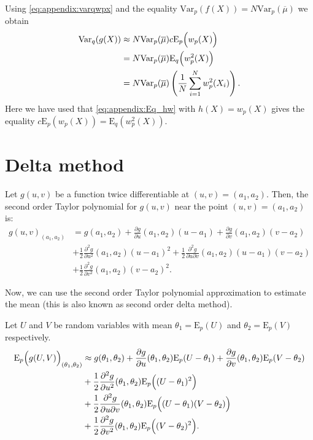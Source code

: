 \documentclass{amsart}
\newcommand{\Var}{\mathrm{Var}}
\theoremstyle{plain}%
\begin{document}
Using \cref{eq:appendix:varqwpx} and the equality $\Var_p(f(X))=N \Var_p(\overline{\mu})$ we obtain
\begin{align}
\Var_q(g(X)) & \approx N \Var_p(\overline{\mu}) c \mathrm{E}_p\Bigl( w_p(X) \Bigr)
\\ & =
N \Var_p(\overline{\mu}) \mathrm{E}_q\Bigl( w^2_p(X) \Bigr)
\\ & =
N \Var_p(\overline{\mu}) \left(\frac{1}{N}\sum_{i=1}^N w_p^2(X_i)\right).
\end{align}
Here we have used that \cref{eq:appendix:Eq_hw} with $h(X)=w_p(X)$ gives the equality $c \mathrm{E}_p( w_p(X) ) = \mathrm{E}_q( w_p^2(X) )$.

\section{Delta method} 

Let $g(u,v)$ be a function twice differentiable at $(u,v) = (a_1,a_2)$. Then, the second order Taylor polynomial for $g(u,v)$ near the point $(u,v) = (a_1,a_2)$ is:
\begin{align}
g(u,v)_{(a_1,a_2)} & = g(a_1,a_2) + \frac{\partial g}{\partial u}(a_1,a_2)(u - a_1) + \frac{\partial g}{\partial v}(a_1,a_2)(v - a_2) \nonumber \\
& + \frac{1}{2} \frac{\partial^2 g}{\partial u^2}(a_1,a_2)(u - a_1)^2 + \frac{1}{2} \frac{\partial^2 g}{\partial u \partial v}(a_1,a_2)(u - a_1) (v - a_2) \nonumber \\
& + \frac{1}{2} \frac{\partial^2 g}{\partial v^2}(a_1,a_2)(v - a_2)^2.
\end{align}

Now, we can use the second order Taylor polynomial approximation to estimate the mean (this is also known as second order delta method).

Let $U$ and $V$ be random variables with mean $\theta_1 = \mathrm{E}_p(U)$ and $\theta_2 = \mathrm{E}_p(V)$ respectively.
\begin{align}
\mathrm{E}_p\Bigl(g(U,V)\Bigr)_{(\theta_1,\theta_2)} & \approx g(\theta_1,\theta_2) + \frac{\partial g}{\partial u}(\theta_1,\theta_2) \mathrm{E}_p(U - \theta_1) + \frac{\partial g}{\partial v}(\theta_1,\theta_2) \mathrm{E}_p(V - \theta_2) \nonumber \\
& +  \frac{1}{2} \frac{\partial^2 g}{\partial u^2}(\theta_1,\theta_2)\mathrm{E}_p\Bigl( (U - \theta_1)^2\Bigr)  \nonumber \\
& + \frac{1}{2} \frac{\partial^2 g}{\partial u \partial v}(\theta_1,\theta_2)\mathrm{E}_p \Bigl( (U - \theta_1) (V - \theta_2) \Bigr) \nonumber \\
& + \frac{1}{2} \frac{\partial^2 g}{\partial v^2}(\theta_1,\theta_2)\mathrm{E}_p \Bigl( (V - \theta_2)^2 \Bigr).
\end{align}
\end{document}
